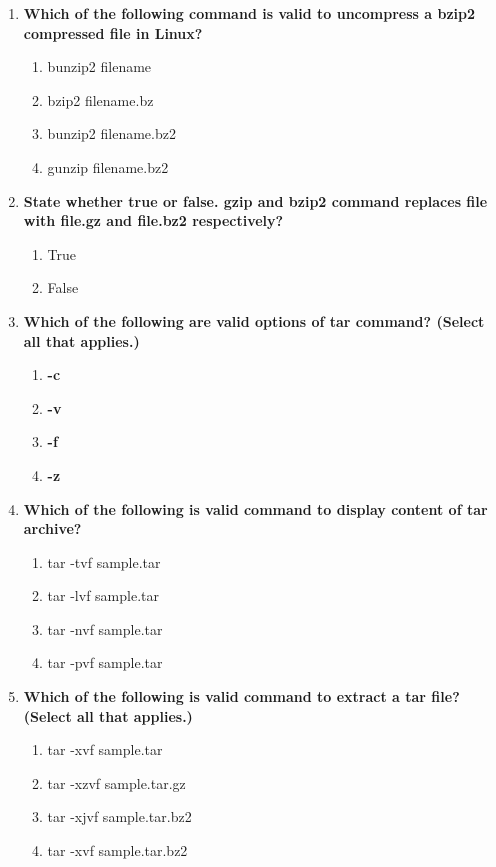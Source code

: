 \begin{flushleft}
\begin{enumerate}
		
		\item \textbf{Which of the following command is valid to uncompress a bzip2 compressed file in Linux?}
		\begin{enumerate}[label=(\alph*)]
			\item bunzip2 filename       
			\item bzip2 filename.bz
			\item bunzip2 filename.bz2   %
			\item gunzip filename.bz2
		\end{enumerate}
		\bigskip
		\bigskip
		
		
		\bigskip
		\bigskip
		\item \textbf{State whether true or false. gzip and bzip2 command replaces \textbf{file} with \textbf{file.gz} and \textbf{file.bz2} respectively?}
		\begin{enumerate}[label=(\alph*)]
			\item True  %
			\item False
		\end{enumerate}
	
		\bigskip
		\bigskip	
		\item \textbf{Which of the following are valid options of tar command? (Select all that applies.)}
		\begin{enumerate}[label=(\alph*)]
			\item \textbf{-c}  %
			\item \textbf{-v}  %
			\item \textbf{-f}  %
			\item \textbf{-z}  %
		\end{enumerate}
		\bigskip
		\bigskip

		\bigskip
		\bigskip	
		\item \textbf{Which of the following is valid command to display content of tar archive?}
		\begin{enumerate}[label=(\alph*)]
			\item tar -tvf sample.tar  %
			\item tar -lvf sample.tar
			\item tar -nvf sample.tar
			\item tar -pvf sample.tar
		\end{enumerate}
		\bigskip
		\bigskip
		
		
		
		\item \textbf{Which of the following is valid command to extract a tar file? (Select all that applies.)}
		\begin{enumerate}[label=(\alph*)]
			\item tar -xvf  sample.tar    %
			\item tar -xzvf sample.tar.gz  %
			\item tar -xjvf sample.tar.bz2   %
			\item tar -xvf  sample.tar.bz2
		\end{enumerate}
		\bigskip
		\bigskip
		
	\end{enumerate}
	
	
\end{flushleft}

\newpage

